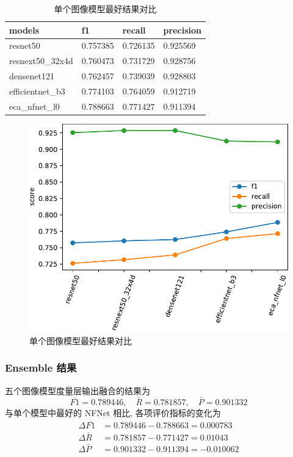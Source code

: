 \documentclass[12pt]{article}
\begin{document}
\begin{table}[htbp]
  \centering
  \caption{单个图像模型最好结果对比}
  \label{tab:image_best_results}
  \begin{tabular}{llll}
    \toprule
    models           & f1       & recall   & precision \\
    \midrule
    resnet50         & 0.757385 & 0.726135 & 0.925569  \\
    resnext50\_32x4d & 0.760473 & 0.731729 & 0.928756  \\
    densenet121      & 0.762457 & 0.739039 & 0.928803  \\
    efficientnet\_b3 & 0.774103 & 0.764059 & 0.912719  \\
    eca\_nfnet\_l0   & 0.788663 & 0.771427 & 0.911394 \\
    \bottomrule
  \end{tabular}
\end{table}

\begin{figure}[htbp]
  \centering
  \includegraphics[width=12cm]{best_results_df.pdf}
  \caption{单个图像模型最好结果对比}
  \label{fig:image_best_results}
\end{figure}

\subsubsection{Ensemble 结果}

五个图像模型度量层输出融合的结果为
\begin{equation}
  \overline{F1}=0.789446,\quad\bar{R}=0.781857,\quad\bar{P}=0.901332
\end{equation}
与单个模型中最好的 NFNet 相比, 各项评价指标的变化为
\begin{equation}
  \begin{aligned}
    \Delta\overline{F1}&=0.789446-0.788663=0.000783\\
    \Delta\bar{R}&=0.781857-0.771427=0.01043\\
    \Delta\bar{P}&=0.901332-0.911394=-0.010062\\
  \end{aligned}
\end{equation}
\end{document}
